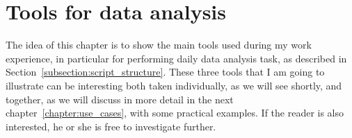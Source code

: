 \chapter{Tools for data analysis}
The idea of this chapter is to show the main tools used during my work experience, in particular for performing daily data analysis task, as described in Section~\ref{subsection:script_structure}.
These three tools that I am going to illustrate can be interesting both taken individually, as we will see shortly, and together, as we will discuss in more detail in the next chapter~\ref{chapter:use_cases}, with some practical examples.
If the reader is also interested, he or she is free to investigate further. 




